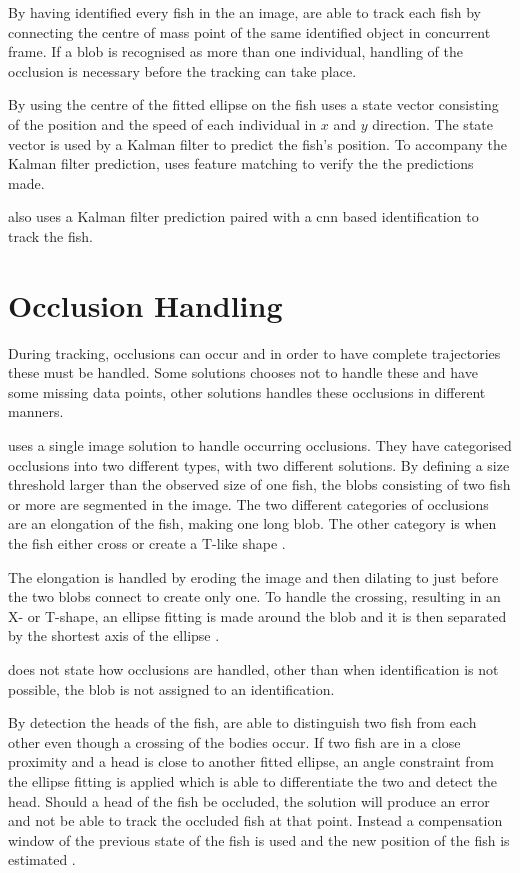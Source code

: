 By having identified every fish in the an image, \cite{idtracker2014} are able to track each fish by connecting the centre of mass point of the same identified object in concurrent frame. If a \gls{blob} is recognised as more than one individual, handling of the occlusion is necessary before the tracking can take place.

By using the centre of the fitted ellipse on the fish \cite{Qian2014} uses a state vector consisting of the position and the speed of each individual in $ x $ and $y$ direction. The state vector is used by a Kalman filter to predict the fish's position. To accompany the Kalman filter prediction, \cite{Qian2014} uses feature matching to verify the the predictions made. 

\cite{Wang2017} also uses a Kalman filter prediction paired with a \gls{cnn} based identification to track the fish.

\section{Occlusion Handling}
During tracking, occlusions can occur and in order to have complete trajectories these must be handled. Some solutions chooses not to handle these and have some missing data points, other solutions handles these occlusions in different manners.

\cite{Dolado2015} uses a single image solution to handle occurring occlusions. They have categorised occlusions into two different types, with two different solutions. By defining a size threshold larger than the observed size of one fish, the \gls{blob}s consisting of two fish or more are segmented in the image. The two different categories of occlusions are an elongation of the fish, making one long \gls{blob}. The other category is when the fish either cross or create a T-like shape \citep{Dolado2015}.

The elongation is handled by eroding the image and then dilating to just before the two \gls{blob}s connect to create only one. To handle the crossing, resulting in an X- or T-shape, an ellipse fitting is made around the \gls{blob} and it is then separated by the shortest axis of the ellipse \citep{Dolado2015}.

\cite{Rodriguez2017} does not state how occlusions are handled, other than when identification is not possible, the \gls{blob} is not assigned to an identification.

By detection the heads of the fish, \cite{Qian2014} are able to distinguish two fish from each other even though a crossing of the bodies occur. If two fish are in a close proximity and a head is close to another fitted ellipse, an angle constraint from the ellipse fitting is applied which is able to differentiate the two and detect the head. Should a head of the fish be occluded, the solution will produce an error and not be able to track the occluded fish at that point. Instead a compensation window of the previous state of the fish is used and the new position of the fish is estimated \citep{Qian2014}. 

